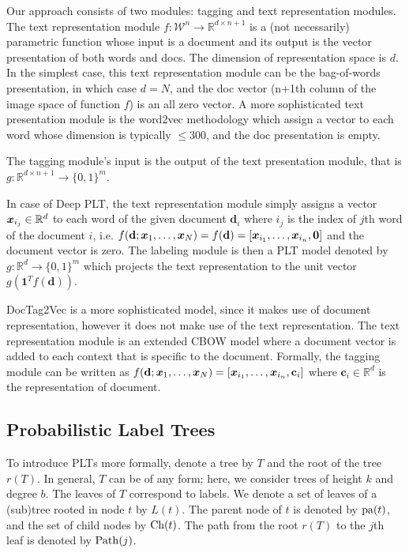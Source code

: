 \documentclass{article}
\newcommand{\bd}{\mathbf{d}}
\newcommand{\bc}{\mathbf{c}}
\newcommand{\calW}{\mathcal{W}}
\newcommand{\Algo}[1]{\textsc{#1}}
\newcommand\R{\mathbb{R}}   %
\newcommand{\sectionBefore}{-0pt}
\newcommand{\sectionAfter}{-0pt}
\begin{document}
Our approach consists of two modules: tagging and text representation modules. The text representation module $f : \calW^{n} \rightarrow \R^{d \times n+1}$ is a (not necessarily) parametric function whose input is a document and its output is the vector presentation of both words and docs. The dimension of representation space is $d$. In the simplest case, this text representation module can be the bag-of-words presentation, in which case $d=N$, and the doc vector (n+1\/th column of the image space of function $f$) is an all zero vector. A more sophisticated text presentation module is the word2vec methodology which assign a vector to each word whose dimension is typically $\le300$, and the doc presentation is empty. 

The tagging module's input is the output of the text presentation module, that is $g: \R^{d \times n+1} \rightarrow  \{ 0 , 1 \}^m$. 

In case of Deep PLT, the text representation module simply assigns a vector $\bx_{i_j} \in \R^d$ to each word of the given document $\bd_i$ where $i_j$ is the index of $j$\/th word of the document $i$, i.e. $f(\bd; \bx_1, \dots, \bx_N) = f(\bd) = \left[\bx_{i_1}, \dots , \bx_{i_n}, \mathbf{0}\right]$ and the document vector is zero. The labeling module is then a PLT model denoted by $g : \R^d \rightarrow  \{ 0 , 1 \}^m$ which projects the text representation to the unit vector $g( \mathbf{1}^T  f(\bd))$.


DocTag2Vec is a more sophisticated model, since it makes use of document representation, however it does not make use of the text representation. The text representation module is an extended CBOW model where a document vector is added to each context that is specific to the document. Formally, the tagging module can be written as $f(\bd; \bx_1, \dots, \bx_N)=\left[\bx_{i_1}, \dots , \bx_{i_n}, \bc_i \right]$ where $\bc_i \in \R ^d$ is the representation of document. 



\vspace{\sectionBefore}
\subsection{Probabilistic Label Trees}
\vspace{\sectionAfter}

To introduce \Algo{PLT}s more formally, denote a tree by $T$ and the root of the tree $r(T)$. In general, $T$ can be of any form; here, we consider trees of height $k$ and degree $b$. 
The leaves of $T$ correspond to labels. We denote a set of leaves of a (sub)tree rooted in node $t$ by $L(t)$. %
The parent node of $t$ is denoted by $\mathrm{pa}(t)$, and the set of child nodes by $\mathrm{Ch}(t)$. The path from the root $r(T)$ to the $j$\/th leaf is denoted by $\mathrm{Path}(j)$. %
\end{document}
